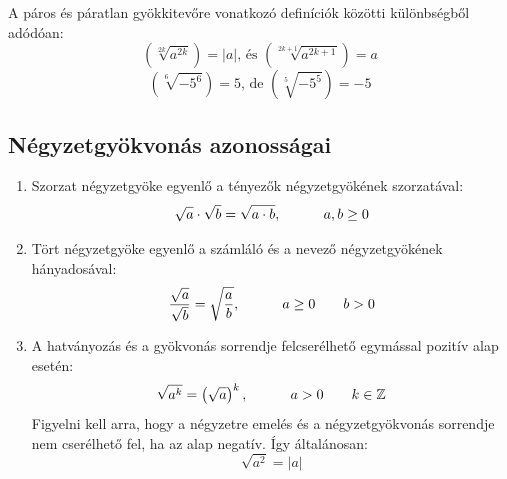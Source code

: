\documentclass[12pt,a4paper]{article}
\begin{document}
A páros és páratlan gyökkitevőre vonatkozó definíciók közötti különbségből adódóan:
$$\left(\sqrt[2k]{a^{2k}}\right)=|a| \text{, és } \left(\sqrt[2k+1]{a^{2k+1}}\right)=a$$
$$\left(\sqrt[6]{-5^{6}}\right)=5 \text{, de } \left(\sqrt[5]{-5^{5}}\right)=-5$$


\subsection{Négyzetgyökvonás azonosságai}

\begin{enumerate}[label=\Roman*.]
\item Szorzat négyzetgyöke egyenlő a tényezők négyzetgyökének szorzatával:
$$\sqrt{a}\cdot \sqrt{b} = \sqrt{a\cdot b}, \hspace{30px} a,b\geq 0$$
\item Tört négyzetgyöke egyenlő a számláló és a nevező négyzetgyökének hányadosával:
$$\dfrac{\sqrt{a}}{\sqrt{b}} = \sqrt{\dfrac{a}{b}}, \hspace{30px} a\geq0 \hspace{20px} b>0$$
\item A hatványozás és a gyökvonás sorrendje felcserélhető egymással pozitív alap esetén:
$$\sqrt{a^k}=\left(\sqrt{a}\right)^k, \hspace{30px} a>0 \hspace{20px} k\in \mathbb{Z}$$
Figyelni kell arra, hogy a négyzetre emelés és a négyzetgyökvonás sorrendje nem cserélhető fel, ha az alap negatív. Így általánosan:
$$\sqrt{a^2}=|a|$$
\end{enumerate}

\newpage
\end{document}
